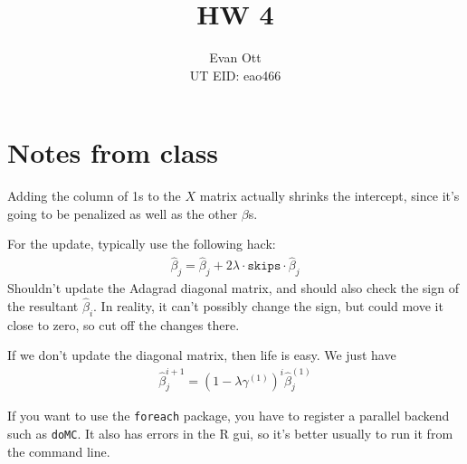 \documentclass{article}
\title{\vspace{-6ex}HW 4\vspace{-2ex}}
\author{Evan Ott \\ UT EID: eao466\vspace{-2ex}}
\begin{document}
\maketitle
\section{Notes from class}
Adding the column of 1s to the $X$ matrix actually shrinks the intercept, since it's going to be penalized as well as
the other $\beta$s.

For the update, typically use the following hack:
\begin{align*}
\hat{\beta}_j = \hat{\beta}_j + 2\lambda \cdot \texttt{skips} \cdot \hat{\beta}_j
\end{align*}
Shouldn't update the Adagrad diagonal matrix, and should also check the sign of the resultant $\hat{\beta}_i$.
In reality, it can't possibly change the sign, but could move it close to zero, so cut off the changes there.

If we don't update the diagonal matrix, then life is easy. We just have 
\begin{align*}
\hat{\beta}_j^{i+1}=\left(1-\lambda \gamma^{(1)}\right)^{i} \hat{\beta}_j^{(1)}
\end{align*}


If you want to use the \texttt{foreach} package, you have to register a parallel backend such as \texttt{doMC}.
It also has errors in the R gui, so it's better usually to run it from the command line.
\end{document}
